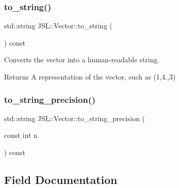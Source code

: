 \mbox{\label{classJSL_1_1Vector_a73579b4a194cc924341806a5d9ea3817}} 
\subsubsection{\texorpdfstring{to\+\_\+string()}{to\_string()}}
{\footnotesize\ttfamily std\+::string J\+S\+L\+::\+Vector\+::to\+\_\+string (\begin{DoxyParamCaption}{ }\end{DoxyParamCaption}) const\hspace{0.3cm}{\ttfamily [inline]}}



Converts the vector into a human-\/readable string. 

\begin{DoxyReturn}{Returns}
A representation of the vector, such as (1,4.,3) 
\end{DoxyReturn}
\mbox{\label{classJSL_1_1Vector_a91d4cf29c2865069520d03292844d84f}} 
\subsubsection{\texorpdfstring{to\+\_\+string\+\_\+precision()}{to\_string\_precision()}}
{\footnotesize\ttfamily std\+::string J\+S\+L\+::\+Vector\+::to\+\_\+string\+\_\+precision (\begin{DoxyParamCaption}\item[{const int}]{n }\end{DoxyParamCaption}) const\hspace{0.3cm}{\ttfamily [inline]}}



\subsection{Field Documentation}
\mbox{\label{classJSL_1_1Vector_aec102ab8391080ddaedeb4605ef40c5c}} 
